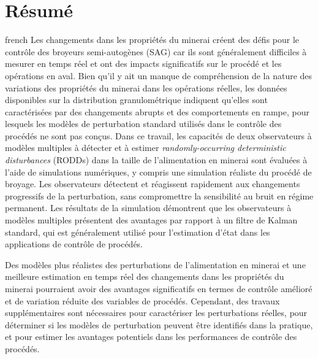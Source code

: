 \chapter*{Résumé}               %
\label{chap-resume}             %

\begin{otherlanguage*}{french}
Les changements dans les propriétés du minerai créent des défis pour le contrôle des broyeurs semi-autogènes (SAG) car ils sont généralement difficiles à mesurer en temps réel et ont des impacts significatifs sur le procédé et les opérations en aval. Bien qu'il y ait un manque de compréhension de la nature des variations des propriétés du minerai dans les opérations réelles, les données disponibles sur la distribution granulométrique indiquent qu'elles sont caractérisées par des changements abrupts et des comportements en rampe, pour lesquels les modèles de perturbation standard utilisés dans le contrôle des procédés ne sont pas conçus. Dans ce travail, les capacités de deux observateurs à modèles multiples à détecter et à estimer \textit{randomly-occurring deterministic disturbances} (\gls{RODD}s) dans la taille de l'alimentation en minerai sont évaluées à l'aide de simulations numériques, y compris une simulation réaliste du procédé de broyage. Les observateurs détectent et réagissent rapidement aux changements progressifs de la perturbation, sans compromettre la sensibilité au bruit en régime permanent. Les résultats de la simulation démontrent que les observateurs à modèles multiples présentent des avantages par rapport à un filtre de Kalman standard, qui est généralement utilisé pour l'estimation d'état dans les applications de contrôle de procédés.

Des modèles plus réalistes des perturbations de l'alimentation en minerai et une meilleure estimation en temps réel des changements dans les propriétés du minerai pourraient avoir des avantages significatifs en termes de contrôle amélioré et de variation réduite des variables de procédés. Cependant, des travaux supplémentaires sont nécessaires pour caractériser les perturbations réelles, pour déterminer si les modèles de perturbation peuvent être identifiés dans la pratique, et pour estimer les avantages potentiels dans les performances de contrôle des procédés.
\end{otherlanguage*}
